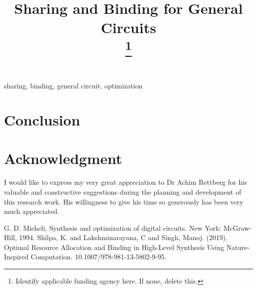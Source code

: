 \documentclass[conference]{IEEEtran}
\begin{document}
\title{Sharing and Binding for General Circuits\\
{\footnotesize }
\thanks{Identify applicable funding agency here. If none, delete this.}
}

\author{

}

\maketitle


\begin{IEEEkeywords}
sharing, binding, general circuit, optimization
\end{IEEEkeywords}












%
%
%
%
%



\section{Conclusion}

\section*{Acknowledgment}
I would like to express my very great appreciation to Dr Achim Rettberg for his valuable and constructive suggestions during the planning and development of this research work. His willingness to give his time so generously has been very much appreciated.

\begin{thebibliography}{00}
 G. D. Micheli, Synthesis and optimization of digital circuits. New York: McGraw-Hill, 1994.
 Shilpa, K. and Lakshminarayana, C and Singh, Manoj. (2019). Optimal Resource Allocation and Binding in High-Level Synthesis Using Nature-Inspired Computation. 10.1007/978-981-13-5802-9-95.  
\end{thebibliography}
\end{document}
